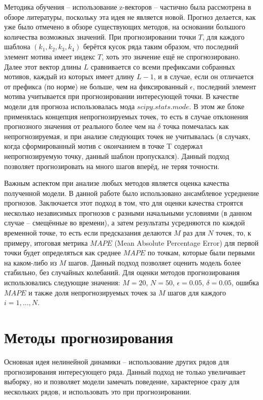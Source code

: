 \documentclass[a4paper, 12pt]{extarticle}
\begin{document}
Методика обучения – использование z-векторов – частично была рассмотрена в обзоре литературы, поскольку эта идея не является новой. Прогноз делается, как уже было отмечено в обзоре существующих методов, на основании большого количества возможных значений. При прогнозировании точки $T$, для каждого шаблона $(k_1,k_2,k_3,k_4)$ берётся кусок ряда таким образом, что последний элемент мотива имеет индекс $T$, хоть это значение ещё не спрогнозировано. Далее этот вектор длины $L$ сравнивается со всеми префиксами собранных мотивов, каждый из которых имеет длину $L-1$, и в случае, если он отличается от префикса (по норме) не больше, чем на фиксированный $\epsilon$, последний элемент мотива учитывается при прогнозировании интересующей точки. В качестве модели для прогноза использовалась мода $scipy.stats.mode$. В этом же блоке применялась концепция непрогнозируемых точек, то есть в случае отклонения прогнозного значения от реального более чем на $\delta$ точка помечалась как непрогнозируемая, и при анализе следующих точек не учитывалась (в случаях, когда сформированный мотив с окончанием в точке T содержал непрогнозируемую точку, данный шаблон пропускался). Данный подход позволяет прогнозировать на много шагов вперёд, не теряя точности.

Важным аспектом при анализе любых методов является оценка качества полученной модели. В данной работе было использовано ансамблевое усреднение прогнозов. Заключается этот подход в том, что для оценки качества строятся несколько независимых прогнозов с разными начальными условиями (в данном случае – смещённые во времени), а затем результаты усредняются по каждой временной точке, то есть если предсказания делаются $M$ раз для $N$ точек, то, к примеру, итоговая метрика $MAPE$ (Mean Absolute Percentage Error) для первой точки будет определяться как среднее $MAPE$ по точкам, которые были первыми на каком-либо из $M$ шагов. Данный подход позволяет оценить модель более стабильно, без случайных колебаний. Для оценки методов прогнозирования использовались следующие значения: $M=20$, $N=50$, $\epsilon=0.05$, $\delta=0.05$, ошибка $MAPE$ и также доля непрогнозируемых точек за $M$ шагов для каждого $i=1,\ldots,N$.

\section{Методы прогнозирования}

Основная идея нелинейной динамики – использование других рядов для прогнозирования интересующего ряда. Данный подход не только увеличивает выборку, но и позволяет модели замечать поведение, характерное сразу для нескольких рядов, и использовать это при прогнозировании. 
\end{document}
